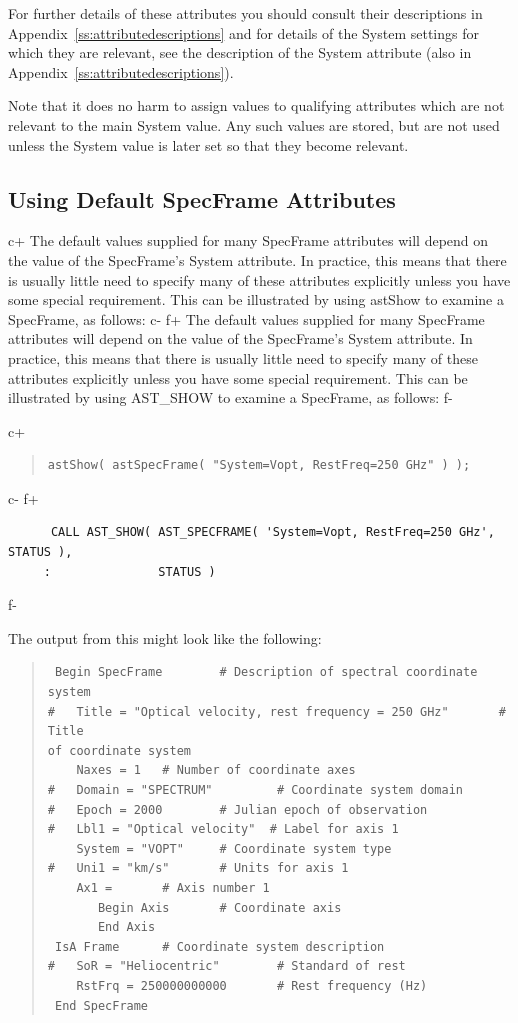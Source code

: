 \documentclass[twoside,11pt]{article}
\newcommand{\appref}[1]{Appendix~\ref{#1}}
\newcommand{\appref}[1]{\ref{#1}}
\begin{document}
For further details of these attributes you should consult their
descriptions in \appref{ss:attributedescriptions} and for details of
the System settings for which they are relevant, see the description
of the System attribute (also in \appref{ss:attributedescriptions}).

Note that it does no harm to assign values to qualifying attributes
which are not relevant to the main System value. Any such values are
stored, but are not used unless the System value is later set so that
they become relevant.

\subsection{Using Default SpecFrame Attributes}

c+
The default values supplied for many SpecFrame attributes will depend
on the value of the SpecFrame's System attribute. In practice, this
means that there is usually little need to specify many of these
attributes explicitly unless you have some special requirement. This
can be illustrated by using astShow to examine a SpecFrame, as follows:
c-
f+
The default values supplied for many SpecFrame attributes will depend
on the value of the SpecFrame's System attribute. In practice, this
means that there is usually little need to specify many of these
attributes explicitly unless you have some special requirement. This
can be illustrated by using AST\_SHOW to examine a SpecFrame, as
follows:
f-

c+
\begin{quote}
\small
\begin{verbatim}
astShow( astSpecFrame( "System=Vopt, RestFreq=250 GHz" ) );
\end{verbatim}
\normalsize
\end{quote}
c-
f+
\small
\begin{verbatim}
      CALL AST_SHOW( AST_SPECFRAME( 'System=Vopt, RestFreq=250 GHz', STATUS ),
     :               STATUS )
\end{verbatim}
\normalsize
f-

The output from this might look like the following:

\begin{quote}
\begin{verbatim}
 Begin SpecFrame        # Description of spectral coordinate system
#   Title = "Optical velocity, rest frequency = 250 GHz"       # Title
of coordinate system
    Naxes = 1   # Number of coordinate axes
#   Domain = "SPECTRUM"         # Coordinate system domain
#   Epoch = 2000        # Julian epoch of observation
#   Lbl1 = "Optical velocity"  # Label for axis 1
    System = "VOPT"     # Coordinate system type
#   Uni1 = "km/s"       # Units for axis 1
    Ax1 =       # Axis number 1
       Begin Axis       # Coordinate axis
       End Axis
 IsA Frame      # Coordinate system description
#   SoR = "Heliocentric"        # Standard of rest
    RstFrq = 250000000000       # Rest frequency (Hz)
 End SpecFrame
\end{verbatim}
\end{quote}
\end{document}
